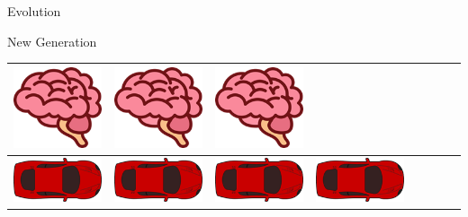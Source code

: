\documentclass{do}
\begin{document}
\begin{frame}{Evolution}
\begin{block}{New Generation}
\begin{tabular}{c|c|c|c|c|c|c|c}
            \includegraphics[scale=0.66]{brain0.png}&
            \includegraphics[scale=0.66]{brain0.png}&
            \includegraphics[scale=0.66]{brain0.png}\\ \hline
            \includegraphics[scale=0.25]{car.png}&
            \includegraphics[scale=0.25]{car.png}&
            \includegraphics[scale=0.25]{car.png}&
            \includegraphics[scale=0.25]{car.png}&

\end{tabular}
\end{block}
\end{frame}
\end{document}
